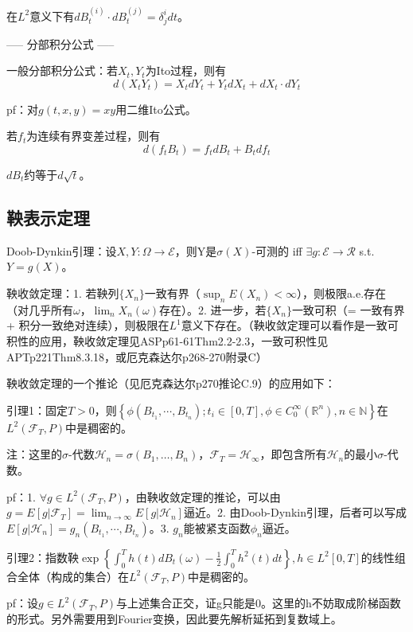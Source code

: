 在$L^2$意义下有$dB_t^{(i)} \cdot dB_t^{(j)} = \delta^{i}_j dt$。

----- 分部积分公式 -----

一般分部积分公式：若$X_t, Y_t$为Ito过程，则有
\[
  d(X_{t} Y_{t})=X_{t} d Y_{t}+Y_{t} d X_{t}+d X_{t} \cdot d Y_{t}
\]

pf：对$g(t, x, y) = xy$用二维Ito公式。

若$f_t$为连续有界变差过程，则有
\[
  d(f_t B_{t})= f_t dB_t + B_{t} d f_{t}
\]

$d B_t$约等于$d \sqrt{t}$。

\subsection{鞅表示定理}

Doob-Dynkin引理：设$X, Y: \Omega \to \mathcal{E}$，则Y是$\sigma(X)$-可测的 iff $\exists g: \mathcal{E} \to \mathcal{R}$ s.t. $Y = g(X)$。

鞅收敛定理：1. 若鞅列$\{X_n\}$一致有界（$\sup_n E(X_n) < \infty$），则极限a.e.存在（对几乎所有$\omega$，$\lim_n X_n(\omega)$存在）。2. 进一步，若$\{X_n\}$一致可积（= 一致有界 + 积分一致绝对连续），则极限在$L^1$意义下存在。（鞅收敛定理可以看作是一致可积性的应用，鞅收敛定理见ASPp61-61Thm2.2-2.3，一致可积性见APTp221Thm8.3.18，或厄克森达尔p268-270附录C）

鞅收敛定理的一个推论（见厄克森达尔p270推论C.9）的应用如下：

引理1：固定$T > 0$，则$\left\{\phi\left(B_{t_{1}}, \cdots, B_{t_{n}}\right) ; t_{i} \in[0, T], \phi \in C_{0}^{\infty}\left(\mathbb{R}^{n}\right), n \in \mathbb{N} \right\}$在$L^{2}\left(\mathcal{F}_{T}, P\right)$中是稠密的。

注：这里的$\sigma$-代数$\mathcal{H}_n = \sigma(B_1, \dots, B_n)$，$\mathcal{F}_{T} = \mathcal{H}_{\infty}$，即包含所有$\mathcal{H}_n$的最小$\sigma$-代数。

pf：1. $\forall g \in L^2(\mathcal{F}_{T}, P)$，由鞅收敛定理的推论，可以由$g=E\left[g | \mathcal{F}_{T}\right]=\lim_{n \rightarrow \infty} E\left[g | \mathcal{H}_{n}\right]$逼近。2. 由Doob-Dynkin引理，后者可以写成$E\left[g | \mathcal{H}_{n}\right]=g_{n}\left(B_{t_{1}}, \cdots, B_{t_{n}}\right)$。3. $g_n$能被紧支函数$\phi_n$逼近。

引理2：指数鞅$\exp \left\{\int_{0}^{T} h(t) d B_{t}(\omega)-\frac{1}{2} \int_{0}^{T} h^{2}(t) d t\right\}, h \in L^{2}[0, T]$的线性组合全体（构成的集合）在$L^{2}\left(\mathcal{F}_{T}, P\right)$中是稠密的。

pf：设$g \in L^2(\mathcal{F}_{T}, P)$与上述集合正交，证g只能是0。这里的h不妨取成阶梯函数的形式。另外需要用到Fourier变换，因此要先解析延拓到复数域上。

